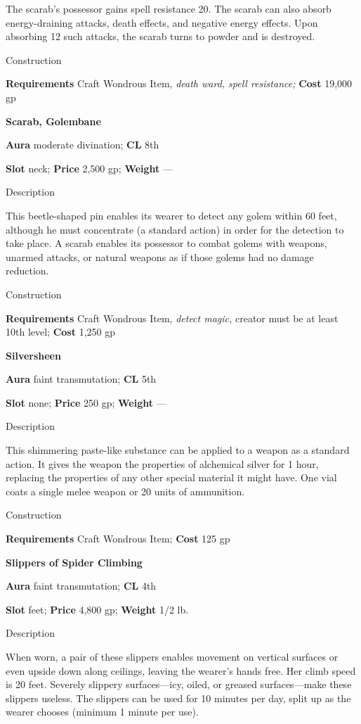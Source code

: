 The scarab's possessor gains spell resistance 20. The scarab can also absorb energy-draining attacks, death effects, and negative energy effects. Upon absorbing 12 such attacks, the scarab turns to powder and is destroyed. 
				
Construction
				
\textbf{Requirements} Craft Wondrous Item, \textit{death ward, spell resistance;}\textbf{ Cost }19,000 gp
				
\textbf{Scarab, Golembane}
				
\textbf{Aura} moderate divination;\textbf{ CL }8th
				
\textbf{Slot} neck; \textbf{Price} 2,500 gp; \textbf{Weight }---
				
Description
				
This beetle-shaped pin enables its wearer to detect any golem within 60 feet, although he must concentrate (a standard action) in order for the detection to take place. A scarab enables its possessor to combat golems with weapons, unarmed attacks, or natural weapons as if those golems had no damage reduction. 
				
Construction
				
\textbf{Requirements} Craft Wondrous Item,\textit{ detect magic, }creator must be at least 10th level;\textbf{ Cost }1,250 gp
				
\textbf{Silversheen}
				
\textbf{Aura} faint transmutation;\textbf{ CL }5th
				
\textbf{Slot} none; \textbf{Price} 250 gp; \textbf{Weight }---
				
Description
				
This shimmering paste-like substance can be applied to a weapon as a standard action. It gives the weapon the properties of alchemical silver for 1 hour, replacing the properties of any other special material it might have. One vial coats a single melee weapon or 20 units of ammunition. 
				
Construction
				
\textbf{Requirements} Craft Wondrous Item;\textbf{ Cost }125 gp
				
\textbf{Slippers of Spider Climbing}
				
\textbf{Aura} faint transmutation;\textbf{ CL }4th
				
\textbf{Slot} feet; \textbf{Price} 4,800 gp; \textbf{Weight} 1/2 lb.
				
Description
				
When worn, a pair of these slippers enables movement on vertical surfaces or even upside down along ceilings, leaving the wearer's hands free. Her climb speed is 20 feet. Severely slippery surfaces---icy, oiled, or greased surfaces---make these slippers useless. The slippers can be used for 10 minutes per day, split up as the wearer chooses (minimum 1 minute per use). 
				

